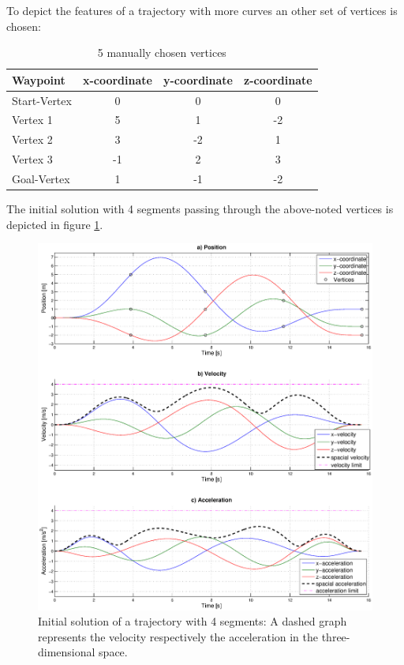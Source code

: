 To depict the features of a trajectory with more curves an other set of vertices is chosen:

\begin{table}[H] 
\begin{center}
    \begin{tabular}{ | l | c | c | c |}
    \hline
    Waypoint & x-coordinate & y-coordinate & z-coordinate\\ \hline
    Start-Vertex & 0 & 0 & 0 \\ \hline
    Vertex 1 & 5 & 1 & -2\\ \hline
   Vertex 2 & 3 & -2 & 1\\ \hline
   Vertex 3 & -1 & 2 & 3\\ \hline
    Goal-Vertex & 1 & -1 & -2\\
    \hline
    \end{tabular}
\caption{5 manually chosen  vertices}
    \label{tab:5vertices}
\end{center}
\end{table}


The initial solution with 4 segments passing through  the above-noted vertices is depicted in figure \ref{pic:optimizedSolution4init}. 

\begin{figure}[H]
   \centering
   \includegraphics[trim = 35mm 30mm 30mm 15mm,clip,width=1\textwidth]{pics/4SegInit15s67.eps}
   \caption{Initial solution of a trajectory with 4 segments: A dashed graph represents the velocity respectively the acceleration in the three-dimensional space.}
   \label{pic:optimizedSolution4init}
\end{figure}
\newpage

